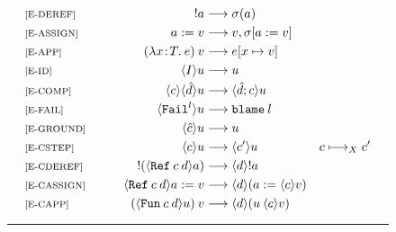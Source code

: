 \begin{figure}[ht!]
\begin{alignat*}{3}
        & {\scriptsize{\text{[E-DEREF]}}} \qquad & !a & \longrightarrow \sigma(a) \\
        & {\scriptsize{\text{[E-ASSIGN]}}} \qquad & a := v & \longrightarrow v, \sigma[a := v] \\
        & {\scriptsize{\text{[E-APP]}}} \qquad & (\lambda x \! : \! T. \:e) \: v & \longrightarrow e[x \mapsto v] \\
        & {\scriptsize{\text{[E-ID]}}} \qquad & \langle I \rangle u & \longrightarrow u \\
        & {\scriptsize{\text{[E-COMP]}}} \qquad & \langle c \rangle \langle \hat{d} \rangle u & \longrightarrow \langle \hat{d};c \rangle u \\
        & {\scriptsize{\text{[E-FAIL]}}} \qquad & \langle \texttt{Fail}^l \rangle u & \longrightarrow \texttt{blame} \: l \\ 
        & {\scriptsize{\text{[E-GROUND]}}} \qquad & \langle \hat{c} \rangle u & \longrightarrow u \\
        & {\scriptsize{\text{[E-CSTEP]}}} \qquad & \langle c \rangle u & \longrightarrow \langle c' \rangle u \hspace{1cm} & c \longmapsto _X c' \\
        & {\scriptsize{\text{[E-CDEREF]}}} \qquad & !(\langle \texttt{Ref} \: c \: d \rangle a) & \longrightarrow \langle d \rangle !a \\
        & {\scriptsize{\text{[E-CASSIGN]}}} \qquad & \langle \texttt{Ref} \: c \: d \rangle a := v & \longrightarrow \langle d \rangle (a := \langle c \rangle v) \\
        & {\scriptsize{\text{[E-CAPP]}}} \qquad & (\langle \texttt{Fun} \: c \: d \rangle u) \: v & \longrightarrow \langle d \rangle (u \: \langle c \rangle v)
    \end{alignat*}
    \hrule
\end{figure} 